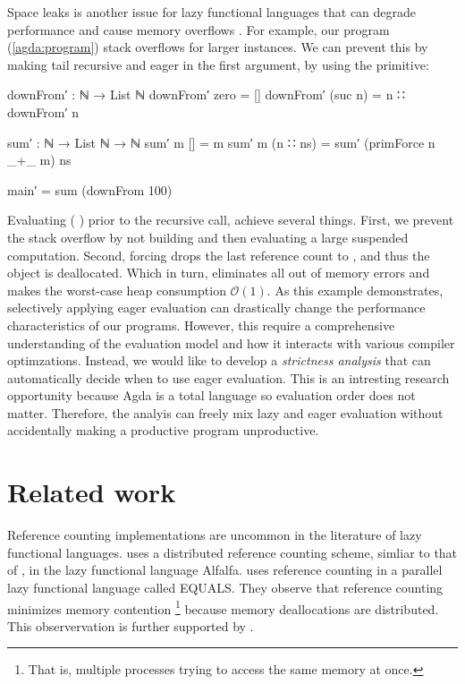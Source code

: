 \documentclass[9pt, twocolumn]{article}
\renewcommand{\AgdaUnderscore}{\texttt{\_}}
\newcommand{\refp}[1]{(\ref{#1})}
\begin{document}
Space leaks is another issue for lazy functional languages that can degrade performance and cause memory overflows \citep{jones1987}.
For example, our program \refp{agda:program} stack overflows for larger instances.
We can prevent this by making  tail recursive and eager in the first argument, by using the \mbox{} primitive:

\begin{code}[number=agda:final-program]
downFrom′ : ℕ → List ℕ
downFrom′ zero = []
downFrom′ (suc n) = n ∷ downFrom′ n 

sum′ : ℕ → List ℕ → ℕ
sum′ m [] = m
sum′ m (n ∷ ns) = 
  sum′ (primForce n _+_ m) ns

main′ = sum (downFrom 100) 
\end{code}
Evaluating (  \AgdaFunction{\AgdaUnderscore+\AgdaUnderscore} ) prior to the recursive call, achieve several things.
First, we prevent the stack overflow by not building and then evaluating a large suspended computation.
Second, forcing \AgdaFunction{\AgdaUnderscore+\AgdaUnderscore} drops the last reference count to , and thus the object is deallocated. 
Which in turn, eliminates all out of memory errors and makes the worst-case heap consumption $\mathcal{O}(1)$.
As this example demonstrates, selectively applying eager evaluation can drastically change the performance characteristics of our programs.
However, this require a comprehensive understanding of the evaluation model and how it interacts with various compiler optimzations.
Instead, we would like to develop a \emph{strictness analysis} \citep{mycroft1980} that can automatically decide when to use eager evaluation.
This is an intresting research opportunity because Agda is a total language so evaluation order does not matter.
Therefore, the analyis can freely mix lazy and eager evaluation without accidentally making a productive program unproductive.

\section{Related work}
Reference counting implementations are uncommon in the literature of lazy functional languages.
\citet{goldberg1988} uses a distributed reference counting scheme, simliar to that of \citet{lermen1986}, in the lazy functional language Alfalfa.
\citet{kaser1992} uses reference counting in a parallel lazy functional language called EQUALS. 
They observe that reference counting minimizes memory contention%
\footnote{That is, multiple processes trying to access the same memory at once.} %
because memory deallocations are distributed. 
This observervation is further supported by \citet{jones1987, jones1996}.
\end{document}
